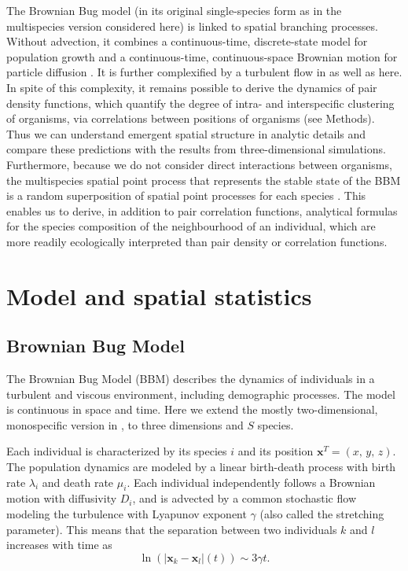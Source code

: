 \documentclass[english]{article}
\newcommand{\bx}{\boldsymbol{x}}
\begin{document}
The Brownian Bug model (in its original single-species form as in
the multispecies version considered here) is linked to spatial branching
processes. Without advection, it combines a continuous-time, discrete-state
model for population growth and a continuous-time, continuous-space
Brownian motion for particle diffusion \citep{birch_master_2006}.
It is further complexified by a turbulent flow in \citet{young_reproductive_2001,picoche_rescience_2022}
as well as here. In spite of this complexity, it remains possible
to derive the dynamics of pair density functions, which quantify the
degree of intra- and interspecific clustering of organisms, via correlations
between positions of organisms (see Methods). Thus we can understand
emergent spatial structure in analytic details and compare these predictions
with the results from three-dimensional simulations. Furthermore,
because we do not consider direct interactions between organisms,
the multispecies spatial point process that represents the stable
state of the BBM is a random superposition of spatial point processes
for each species \citep{illian2008statistical}. This enables us to
derive, in addition to pair correlation functions, analytical formulas
for the species composition of the neighbourhood of an individual,
which are more readily ecologically interpreted than pair density
or correlation functions. 


\section*{Model and spatial statistics}

\subsection*{Brownian Bug Model}

The Brownian Bug Model (BBM) describes the dynamics of individuals
in a turbulent and viscous environment, including demographic processes.
The model is continuous in space and time. Here we extend the mostly
two-dimensional, monospecific version in \citet{young_reproductive_2001},
to three dimensions and $S$ species.

Each individual is characterized by its species $i$ and its position
$\mathbf{x}^{T}=(x,\,y,\,z)$. The population dynamics are modeled
by a linear birth-death process with birth rate $\lambda_{i}$ and
death rate $\mu_{i}$. Each individual independently follows a Brownian
motion with diffusivity $D_{i}$, and is advected by a common stochastic
flow modeling the turbulence with Lyapunov exponent $\gamma$ (also
called the stretching parameter). This means that the separation between
two individuals $k$ and $l$ increases with time as
\begin{equation}
\ln\left(|\bx_{k}-\bx_{l}|(t)\right)\sim3\gamma t.\label{eq:gamma_def}
\end{equation}
\end{document}

